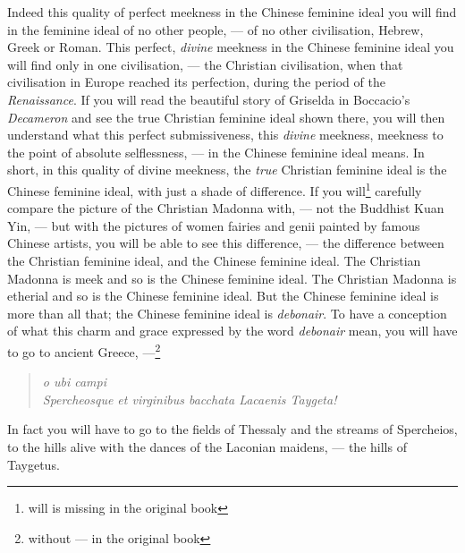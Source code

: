 Indeed this quality of perfect meekness in the Chinese feminine ideal you will find in the feminine ideal of no other people, --- of no other civilisation, Hebrew, Greek or Roman.
This perfect, \emph{divine} meekness in the Chinese feminine ideal you will find only in one civilisation, --- the Christian civilisation, when that civilisation in Europe reached its perfection, during the period of the \emph{Renaissance}.
If you will read the beautiful story of Griselda in Boccacio's \emph{Decameron} and see the true Christian feminine ideal shown there, you will then understand what this perfect submissiveness, this \emph{divine} meekness, meekness to the point of absolute selflessness, --- in the Chinese feminine ideal means.
In short, in this quality of divine meekness, the \emph{true} Christian feminine ideal is the Chinese feminine ideal, with just a shade of difference.
If you will\footnote{will is missing in the original book} carefully compare the picture of the Christian Madonna with, --- not the Buddhist Kuan Yin, --- but with the pictures of women fairies and genii painted by famous Chinese artists, you will be able to see this difference, --- the difference between the Christian feminine ideal, and the Chinese feminine ideal.
The Christian Madonna is meek and so is the Chinese feminine ideal.
The Christian Madonna is etherial and so is the Chinese feminine ideal.
But the Chinese feminine ideal is more than all that; the Chinese feminine ideal is \emph{debonair}.
To have a conception of what this charm and grace expressed by the word \emph{debonair} mean, you will have to go to ancient Greece, ---\footnote{without --- in the original book}
\begin{quote}\footnotesize
   \emph {\hfill o ubi campi\\ Spercheosque et virginibus bacchata Lacaenis Taygeta! \hfill}
\end{quote}

In fact you will have to go to the fields of Thessaly  and the streams of Spercheios,  to the hills alive with the dances of the Laconian  maidens, --- the hills of Taygetus. 

